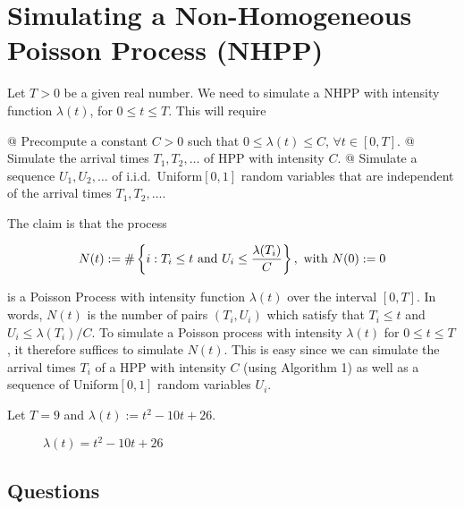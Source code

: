 \documentclass[10pt]{article}
\begin{document}
\section{Simulating a Non-Homogeneous Poisson Process (NHPP)}

Let $T>0$ be a given real number. We need to simulate a NHPP with intensity
function $\lambda(t)$, for $0 \le t \le T$. This will require

\begin{easylist}[itemize]
    @ Precompute a constant $C > 0$ such that $0 \le \lambda(t) \le C$, $\forall
    t \in [0, T]$.
    @ Simulate the arrival times $T_1, T_2, \ldots$ of HPP with intensity $C$.
    @ Simulate a sequence $U_1, U_2, \ldots$ of i.i.d.\ Uniform$[0,1]$ random
    variables that are independent of the arrival times $T_1, T_2, \ldots$.
\end{easylist}

The claim is that the process

\begin{align*}
    N(t) := \# \left\{ 
        i: T_i \le t \text{ and } U_i \le \frac{\lambda(T_i)}{C}
     \right\}, \text{ with } N(0) := 0
\end{align*}

is a Poisson Process with intensity function $\lambda(t)$ over the interval
$[0,T]$. In words, $N(t)$ is the number of pairs $(T_i, U_i)$ which satisfy that
$T_i \le t$ and $U_i \le \lambda(T_i) / C$. To simulate a Poisson process with
intensity $\lambda(t)$ for $0 \le t \le T$, it therefore suffices to simulate
$N(t)$. This is easy since we can simulate the arrival times $T_i$ of a HPP with
intensity $C$ (using Algorithm 1) as well as a sequence of Uniform$[0,1]$ random
variables $U_i$.

Let $T=9$ and $\lambda(t) := t^2 - 10 t + 26$.

\begin{figure}[H]
    \centering
    \caption{$\lambda(t) = t^2 - 10 t + 26$}
\end{figure}

\subsection{Questions}
\end{document}
